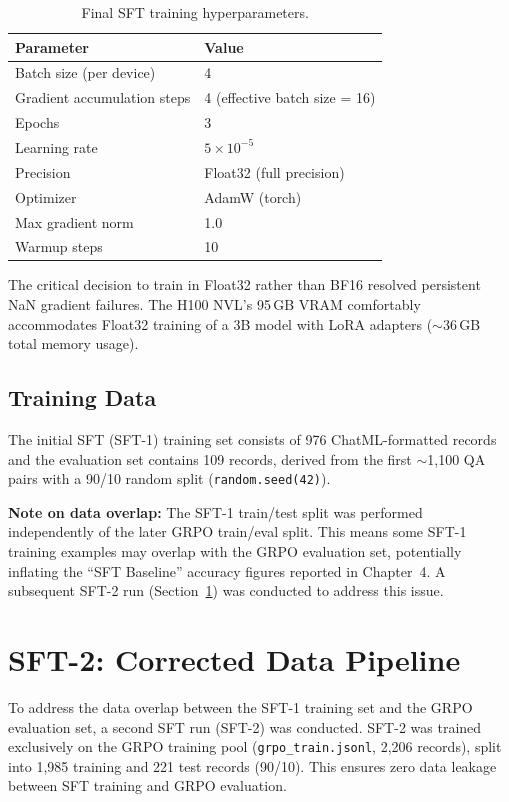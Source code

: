 \documentclass[12pt]{report}
\begin{document}
\begin{table}[H]
\centering
\caption{Final SFT training hyperparameters.}
\label{tab:sft_config}
\begin{tabular}{ll}
\toprule
\textbf{Parameter} & \textbf{Value} \\
\midrule
Batch size (per device) & 4 \\
Gradient accumulation steps & 4 (effective batch size = 16) \\
Epochs & 3 \\
Learning rate & $5 \times 10^{-5}$ \\
Precision & Float32 (full precision) \\
Optimizer & AdamW (torch) \\
Max gradient norm & 1.0 \\
Warmup steps & 10 \\
\bottomrule
\end{tabular}
\end{table}

The critical decision to train in Float32 rather than BF16 resolved persistent NaN gradient failures. The H100 NVL's 95\,GB VRAM comfortably accommodates Float32 training of a 3B model with LoRA adapters ($\sim$36\,GB total memory usage).

\subsection{Training Data}

The initial SFT (SFT-1) training set consists of 976 ChatML-formatted records and the evaluation set contains 109 records, derived from the first $\sim$1,100 QA pairs with a 90/10 random split (\texttt{random.seed(42)}).

\textbf{Note on data overlap:} The SFT-1 train/test split was performed independently of the later GRPO train/eval split. This means some SFT-1 training examples may overlap with the GRPO evaluation set, potentially inflating the ``SFT Baseline'' accuracy figures reported in Chapter~4. A subsequent SFT-2 run (Section~\ref{sec:sft2}) was conducted to address this issue.

\section{SFT-2: Corrected Data Pipeline}
\label{sec:sft2}

To address the data overlap between the SFT-1 training set and the GRPO evaluation set, a second SFT run (SFT-2) was conducted. SFT-2 was trained exclusively on the GRPO training pool (\texttt{grpo\_train.jsonl}, 2,206 records), split into 1,985 training and 221 test records (90/10). This ensures zero data leakage between SFT training and GRPO evaluation.
\end{document}
